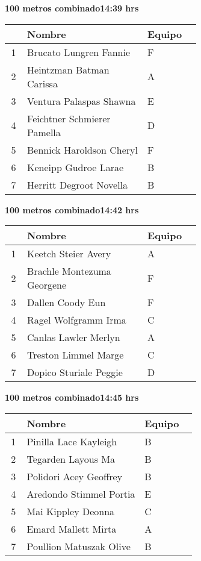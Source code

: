 \begin{minipage}{0.95\linewidth}
\begin{center}
\textbf{
100 metros combinado\hspace{1cm}14:39 hrs}
\end{center}
\begin{tabular}{cp{0.63\linewidth}l}
\hline
& \textbf{Nombre} & \textbf{Equipo} \\ \hline
1 & Brucato Lungren Fannie & F \\ 
2 & Heintzman Batman Carissa & A \\ 
3 & Ventura Palaspas Shawna & E \\ 
4 & Feichtner Schmierer Pamella & D \\ 
5 & Bennick Haroldson Cheryl & F \\ 
6 & Keneipp Gudroe Larae & B \\ 
7 & Herritt Degroot Novella & B \\ 
\end{tabular}
\end{minipage}
\begin{minipage}{0.95\linewidth}
\begin{center}
\textbf{
100 metros combinado\hspace{1cm}14:42 hrs}
\end{center}
\begin{tabular}{cp{0.63\linewidth}l}
\hline
& \textbf{Nombre} & \textbf{Equipo} \\ \hline
1 & Keetch Steier Avery & A \\ 
2 & Brachle Montezuma Georgene & F \\ 
3 & Dallen Coody Eun & F \\ 
4 & Ragel Wolfgramm Irma & C \\ 
5 & Canlas Lawler Merlyn & A \\ 
6 & Treston Limmel Marge & C \\ 
7 & Dopico Sturiale Peggie & D \\ 
\end{tabular}
\end{minipage}
\begin{minipage}{0.95\linewidth}
\begin{center}
\textbf{
100 metros combinado\hspace{1cm}14:45 hrs}
\end{center}
\begin{tabular}{cp{0.63\linewidth}l}
\hline
& \textbf{Nombre} & \textbf{Equipo} \\ \hline
1 & Pinilla Lace Kayleigh & B \\ 
2 & Tegarden Layous Ma & B \\ 
3 & Polidori Acey Geoffrey & B \\ 
4 & Aredondo Stimmel Portia & E \\ 
5 & Mai Kippley Deonna & C \\ 
6 & Emard Mallett Mirta & A \\ 
7 & Poullion Matuszak Olive & B \\ 
\end{tabular}
\end{minipage}
